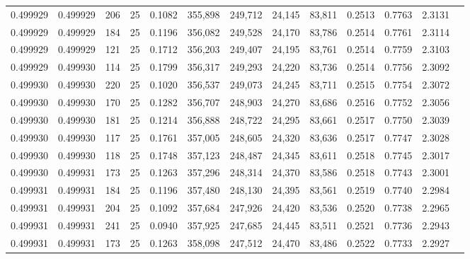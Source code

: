 \begin{tabular}{rrrrrrrrrrrrr}
0.499929 & 0.499929 &   206 &  25 &                                     0.1082 & 355,898 & 249,712 &  24,145 &  83,811 & 0.2513 & 0.7763 & 2.3131 \\
0.499929 & 0.499929 &   184 &  25 &                                     0.1196 & 356,082 & 249,528 &  24,170 &  83,786 & 0.2514 & 0.7761 & 2.3114 \\
0.499929 & 0.499929 &   121 &  25 &                                     0.1712 & 356,203 & 249,407 &  24,195 &  83,761 & 0.2514 & 0.7759 & 2.3103 \\
0.499929 & 0.499930 &   114 &  25 &                                     0.1799 & 356,317 & 249,293 &  24,220 &  83,736 & 0.2514 & 0.7756 & 2.3092 \\
0.499930 & 0.499930 &   220 &  25 &                                     0.1020 & 356,537 & 249,073 &  24,245 &  83,711 & 0.2515 & 0.7754 & 2.3072 \\
0.499930 & 0.499930 &   170 &  25 &                                     0.1282 & 356,707 & 248,903 &  24,270 &  83,686 & 0.2516 & 0.7752 & 2.3056 \\
0.499930 & 0.499930 &   181 &  25 &                                     0.1214 & 356,888 & 248,722 &  24,295 &  83,661 & 0.2517 & 0.7750 & 2.3039 \\
0.499930 & 0.499930 &   117 &  25 &                                     0.1761 & 357,005 & 248,605 &  24,320 &  83,636 & 0.2517 & 0.7747 & 2.3028 \\
0.499930 & 0.499930 &   118 &  25 &                                     0.1748 & 357,123 & 248,487 &  24,345 &  83,611 & 0.2518 & 0.7745 & 2.3017 \\
0.499930 & 0.499931 &   173 &  25 &                                     0.1263 & 357,296 & 248,314 &  24,370 &  83,586 & 0.2518 & 0.7743 & 2.3001 \\
0.499931 & 0.499931 &   184 &  25 &                                     0.1196 & 357,480 & 248,130 &  24,395 &  83,561 & 0.2519 & 0.7740 & 2.2984 \\
0.499931 & 0.499931 &   204 &  25 &                                     0.1092 & 357,684 & 247,926 &  24,420 &  83,536 & 0.2520 & 0.7738 & 2.2965 \\
0.499931 & 0.499931 &   241 &  25 &                                     0.0940 & 357,925 & 247,685 &  24,445 &  83,511 & 0.2521 & 0.7736 & 2.2943 \\
0.499931 & 0.499931 &   173 &  25 &                                     0.1263 & 358,098 & 247,512 &  24,470 &  83,486 & 0.2522 & 0.7733 & 2.2927 \\

\end{tabular}
